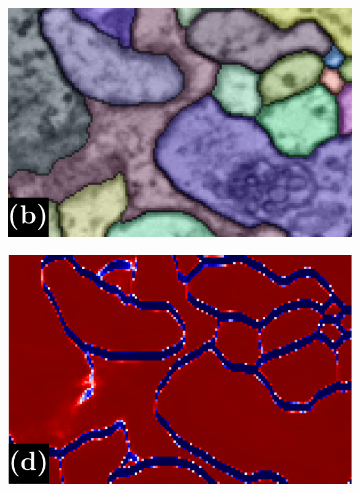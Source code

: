 \begin{figure}[t]
\begin{subfigure}[t]{0.32\linewidth}
\end{subfigure}\vspace{0.6em}\\
\begin{subfigure}[t]{0.32\textwidth}
\centering
\includegraphics[width=1.0\linewidth,trim=0in 0in 0in 0.2in,clip]{./figs/aff_compare_designer/GT.pdf} %
\end{subfigure}\hfill
\begin{subfigure}[t]{0.32\linewidth}
\centering
\includegraphics[width=1.0\linewidth,trim=0in 0in 0in 0.2in,clip]{./figs/aff_compare_designer/dice_1.pdf} %
\end{subfigure}\hfill
\begin{subfigure}[t]{0.32\textwidth}
\centering

\end{subfigure}
\end{figure}
